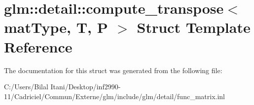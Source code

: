 \hypertarget{structglm_1_1detail_1_1compute__transpose}{}\section{glm\+:\+:detail\+:\+:compute\+\_\+transpose$<$ mat\+Type, T, P $>$ Struct Template Reference}
\label{structglm_1_1detail_1_1compute__transpose}


The documentation for this struct was generated from the following file\+:\begin{DoxyCompactItemize}
\item 
C\+:/\+Users/\+Bilal Itani/\+Desktop/inf2990-\/11/\+Cadriciel/\+Commun/\+Externe/glm/include/glm/detail/func\+\_\+matrix.\+inl\end{DoxyCompactItemize}
